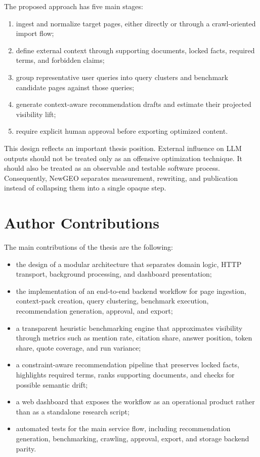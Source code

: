 The proposed approach has five main stages:
\begin{enumerate}
    \item ingest and normalize target pages, either directly or through a crawl-oriented import flow;
    \item define external context through supporting documents, locked facts, required terms, and forbidden claims;
    \item group representative user queries into query clusters and benchmark candidate pages against those queries;
    \item generate context-aware recommendation drafts and estimate their projected visibility lift;
    \item require explicit human approval before exporting optimized content.
\end{enumerate}

This design reflects an important thesis position. External influence on LLM outputs should not
be treated only as an offensive optimization technique. It should also be treated as an
observable and testable software process. Consequently, NewGEO separates measurement,
rewriting, and publication instead of collapsing them into a single opaque step.

\section{Author Contributions}

The main contributions of the thesis are the following:
\begin{itemize}
    \item the design of a modular architecture that separates domain logic, HTTP transport, background processing, and dashboard presentation;
    \item the implementation of an end-to-end backend workflow for page ingestion, context-pack creation, query clustering, benchmark execution, recommendation generation, approval, and export;
    \item a transparent heuristic benchmarking engine that approximates visibility through metrics such as mention rate, citation share, answer position, token share, quote coverage, and run variance;
    \item a constraint-aware recommendation pipeline that preserves locked facts, highlights required terms, ranks supporting documents, and checks for possible semantic drift;
    \item a web dashboard that exposes the workflow as an operational product rather than as a standalone research script;
    \item automated tests for the main service flow, including recommendation generation, benchmarking, crawling, approval, export, and storage backend parity.
\end{itemize}

